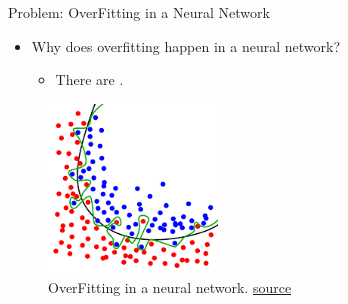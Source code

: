 \begin{frame}{Problem: OverFitting in a Neural Network}
	\begin{itemize}
		\item Why does overfitting happen in a neural network?
		\begin{itemize}
			\item There are .
		\end{itemize}
	\end{itemize}
    \begin{figure}[H]
        \centering
        \includegraphics[width=0.4\textwidth]{Figs/section_4/overfitting.png}
        \caption{OverFitting in a neural network. \href{https://en.wikipedia.org/wiki/Overfitting}{source}}
    \end{figure}
\end{frame}

